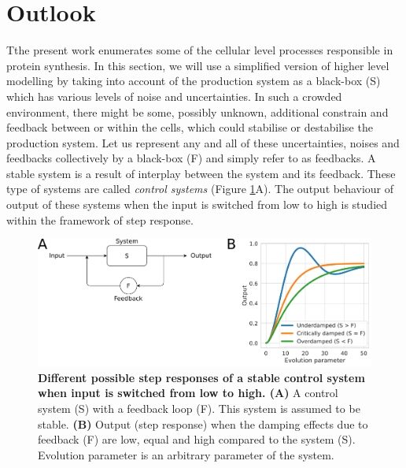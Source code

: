 \section{Outlook}
Tthe present work enumerates some of the cellular level processes responsible in protein synthesis. In this section, we will use a simplified version of higher level modelling by taking into account of the production system as a black-box (S) which has various levels of noise and uncertainties. In such a crowded environment, there might be some, possibly unknown, additional constrain and feedback between or within the cells, which could stabilise or destabilise the production system. Let us represent any and all of these uncertainties, noises and feedbacks collectively by a black-box (F) and simply refer to as feedbacks. A stable system is a result of interplay between the system and its feedback. These type of systems are called \textit{control systems} (Figure \ref{fig:control_system}A). The output behaviour of output of these systems when the input is switched from low to high is studied within the framework of step response.

\begin{figure}[htbp!]
\center
\includegraphics[width=1\textwidth]{chapters/Discussion/Figures/control_system.png}
\caption[Different possible step responses of a stable control system when input is switched from low to high.]{\textbf{Different possible step responses of a stable control system when input is switched from low to high. (A)} A control system (S) with a feedback loop (F). This system is assumed to be stable. \textbf{(B)} Output (step response) when the damping effects due to feedback (F) are low, equal and high compared to the system (S). Evolution parameter is an arbitrary parameter of the system.}%
\label{fig:control_system}
\end{figure}

